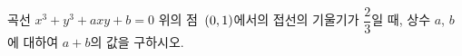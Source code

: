 곡선 $x^3+y^3+axy+b=0$ 위의 점~$(0{,}\mkern3mu\mathopen{}1)$에서의 접선의 기울기가 $\dfrac{2}{3}$일 때, 상수 $a$, $b$에 대하여 $a+b$의 값을 구하시오.
